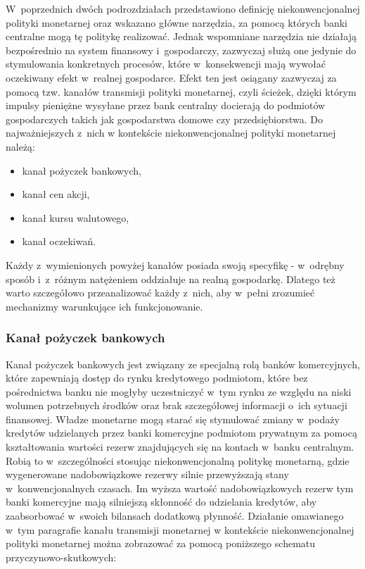 W~poprzednich dwóch podrozdziałach przedstawiono definicję niekonwencjonalnej polityki monetarnej oraz wskazano główne narzędzia, za pomocą których banki centralne mogą tę politykę realizować. Jednak wspomniane narzędzia nie działają bezpośrednio na system finansowy i~gospodarczy, zazwyczaj służą one jedynie do stymulowania konkretnych procesów, które w~konsekwencji mają wywołać oczekiwany efekt w~realnej gospodarce. Efekt ten jest osiągany zazwyczaj za pomocą tzw. kanałów transmisji polityki monetarnej, czyli ścieżek, dzięki którym impulsy pieniężne wysyłane przez bank centralny docierają do podmiotów gospodarczych takich jak gospodarstwa domowe czy przedsiębiorstwa. Do najważniejszych z~nich w kontekście niekonwencjonalnej polityki monetarnej należą:

\begin{itemize}
\setlength\itemsep{0.05cm}
\item kanał pożyczek bankowych,
\item kanał cen akcji,
\item kanał kursu walutowego,
\item kanał oczekiwań.
\end{itemize}

\noindent Każdy z~wymienionych powyżej kanałów posiada swoją specyfikę - w~odrębny sposób i~z~różnym natężeniem oddziałuje na realną gospodarkę. Dlatego też warto szczegółowo przeanalizować każdy z~nich, aby w~pełni zrozumieć mechanizmy warunkujące ich funkcjonowanie.

\subsubsection*{\normalsize{Kanał pożyczek bankowych}}

Kanał pożyczek bankowych jest związany ze specjalną rolą banków komercyjnych, które zapewniają dostęp do rynku kredytowego podmiotom, które bez pośrednictwa banku nie mogłyby uczestniczyć w~tym rynku ze względu na niski wolumen potrzebnych środków oraz brak szczegółowej informacji o~ich sytuacji finansowej. Władze monetarne mogą starać się stymulować zmiany w~podaży kredytów udzielanych przez banki komercyjne podmiotom prywatnym za pomocą kształtowania wartości rezerw znajdujących się na kontach w~banku centralnym. Robią to w~szczególności stosując niekonwencjonalną politykę monetarną, gdzie wygenerowane nadobowiązkowe rezerwy silnie przewyższają stany w~konwencjonalnych czasach. Im wyższa wartość nadobowiązkowych rezerw tym banki komercyjne mają silniejszą skłonność do udzielania kredytów, aby zaabsorbować w~swoich bilansach dodatkową płynność. Działanie omawianego w~tym paragrafie kanału transmisji monetarnej w kontekście niekonwencjonalnej polityki monetarnej można zobrazować za pomocą poniższego schematu przyczynowo-skutkowych:

